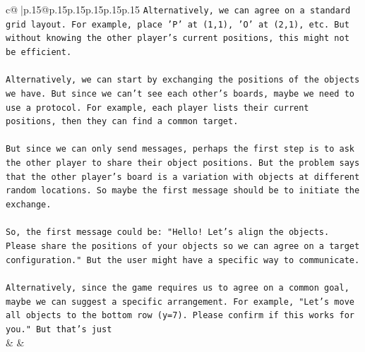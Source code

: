\documentclass{article}
\begin{document}
{\begin{supertabular}{c@{$\;$}|p{.15\linewidth}@{}p{.15\linewidth}p{.15\linewidth}p{.15\linewidth}p{.15\linewidth}p{.15\linewidth}}
{{{\texttt{Alternatively, we can agree on a standard grid layout. For example, place 'P' at (1,1), 'O' at (2,1), etc. But without knowing the other player's current positions, this might not be efficient.} \\
\\ 
\texttt{Alternatively, we can start by exchanging the positions of the objects we have. But since we can't see each other's boards, maybe we need to use a protocol. For example, each player lists their current positions, then they can find a common target.} \\
\\ 
\texttt{But since we can only send messages, perhaps the first step is to ask the other player to share their object positions. But the problem says that the other player's board is a variation with objects at different random locations. So maybe the first message should be to initiate the exchange.} \\
\\ 
\texttt{So, the first message could be: "Hello! Let's align the objects. Please share the positions of your objects so we can agree on a target configuration." But the user might have a specific way to communicate.} \\
\\ 
\texttt{Alternatively, since the game requires us to agree on a common goal, maybe we can suggest a specific arrangement. For example, "Let's move all objects to the bottom row (y=7). Please confirm if this works for you." But that's just} \\
            }
        }
    }
    & & \\ \\


\end{supertabular}}
\end{document}
